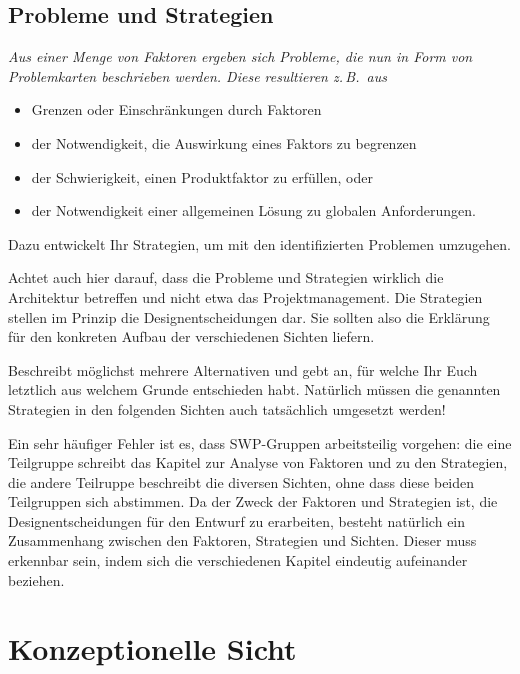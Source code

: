 \documentclass[fontsize=12pt,paper=a4,twoside]{scrartcl}
\begin{document}
\subsection{Probleme und Strategien} \label{sec:strategien}

{ \em Aus einer Menge von Faktoren ergeben sich Probleme, die nun in 
  Form von Problemkarten beschrieben werden. Diese resultieren z.\,B.\ 
  aus
  \begin{itemize}
    \item Grenzen oder Einschränkungen durch Faktoren
    \item der Notwendigkeit, die Auswirkung eines Faktors zu begrenzen
    \item der Schwierigkeit, einen Produktfaktor zu erfüllen, oder
    \item der Notwendigkeit einer allgemeinen Lösung zu globalen 
      Anforderungen.
  \end{itemize}
  Dazu entwickelt Ihr Strategien, um mit den identifizierten Problemen 
  umzugehen.

  Achtet auch hier darauf, dass die Probleme und Strategien wirklich 
  die Architektur betreffen und nicht etwa das Projektmanagement. Die 
  Strategien stellen im Prinzip die Designentscheidungen dar. Sie 
  sollten also die Erklärung für den konkreten Aufbau der 
  verschiedenen Sichten liefern.

  Beschreibt möglichst mehrere Alternativen und gebt an, für welche 
  Ihr Euch letztlich aus welchem Grunde entschieden habt. Natürlich 
  müssen die genannten Strategien in den folgenden Sichten auch 
  tatsächlich umgesetzt werden!

  Ein sehr häufiger Fehler ist es, dass SWP-Gruppen arbeitsteilig 
  vorgehen: die eine Teilgruppe schreibt das Kapitel zur Analyse von 
  Faktoren und zu den Strategien, die andere Teilruppe beschreibt die 
  diversen Sichten, ohne dass diese beiden Teilgruppen sich abstimmen. 
  Da der Zweck der Faktoren und Strategien ist, die 
  Designentscheidungen für den Entwurf zu erarbeiten, besteht 
  natürlich ein Zusammenhang zwischen den Faktoren, Strategien und 
  Sichten. Dieser muss erkennbar sein, indem sich die verschiedenen 
  Kapitel eindeutig aufeinander beziehen.
}


\section{Konzeptionelle Sicht} \label{sec:konzeptionell}
\end{document}

